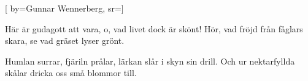 

[ 		%
	by={Gunnar Wennerberg},					%
	sr={}]						%
	
\beginverse*						%
Här är gudagott att vara,
o, vad livet dock är skönt!
Hör, vad fröjd från fåglars skara,
se vad gräset lyser grönt.
\endverse							%

\beginchorus						%
Humlan surrar, fjäriln prålar,
lärkan slår i skyn sin drill.
Och ur nektarfyllda skålar
dricka oss små blommor till.
\endchorus							%
\endsong							%